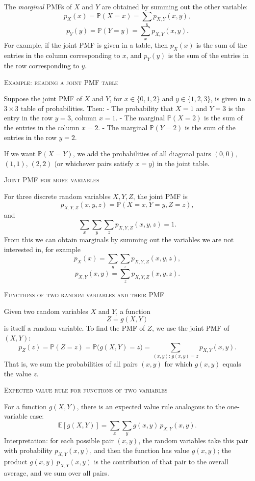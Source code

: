 The \textit{marginal} PMFs of \(X\) and \(Y\) are obtained by summing out the other variable:
\[
p_X(x) = \mathbb{P}(X = x) = \sum_{y} p_{X,Y}(x,y),
\]
\[
p_Y(y) = \mathbb{P}(Y = y) = \sum_{x} p_{X,Y}(x,y).
\]
For example, if the joint PMF is given in a table, then \(p_X(x)\) is the sum of the entries in the column corresponding to \(x\), and \(p_Y(y)\) is the sum of the entries in the row corresponding to \(y\).

\bigskip\textsc{Example: reading a joint PMF table}

Suppose the joint PMF of \(X\) and \(Y\), for \(x \in \{0,1,2\}\) and \(y \in \{1,2,3\}\), is given in a \(3\times 3\) table of probabilities.  
Then:
- The probability that \(X=1\) and \(Y=3\) is the entry in the row \(y=3\), column \(x=1\).  
- The marginal \(\mathbb{P}(X=2)\) is the sum of the entries in the column \(x=2\).  
- The marginal \(\mathbb{P}(Y=2)\) is the sum of the entries in the row \(y=2\).  

If we want \(\mathbb{P}(X=Y)\), we add the probabilities of all diagonal pairs \((0,0)\), \((1,1)\), \((2,2)\) (or whichever pairs satisfy \(x=y\)) in the joint table.

\bigskip\textsc{Joint PMF for more variables}

For three discrete random variables \(X,Y,Z\), the joint PMF is
\[
p_{X,Y,Z}(x,y,z) = \mathbb{P}(X=x, Y=y, Z=z),
\]
and
\[
\sum_{x}\sum_{y}\sum_{z} p_{X,Y,Z}(x,y,z) = 1.
\]
From this we can obtain marginals by summing out the variables we are not interested in, for example
\[
p_X(x) = \sum_{y}\sum_{z} p_{X,Y,Z}(x,y,z),
\]
\[
p_{X,Y}(x,y) = \sum_{z} p_{X,Y,Z}(x,y,z).
\]

\bigskip\textsc{Functions of two random variables and their PMF}

Given two random variables \(X\) and \(Y\), a function
\[
Z = g(X,Y)
\]
is itself a random variable.  
To find the PMF of \(Z\), we use the joint PMF of \((X,Y)\):
\[
p_Z(z) = \mathbb{P}(Z = z)
= \mathbb{P}\bigl(g(X,Y) = z\bigr)
= \sum_{(x,y):\, g(x,y) = z} p_{X,Y}(x,y).
\]
That is, we sum the probabilities of all pairs \((x,y)\) for which \(g(x,y)\) equals the value \(z\).

\bigskip\textsc{Expected value rule for functions of two variables}

For a function \(g(X,Y)\), there is an expected value rule analogous to the one-variable case:
\[
\mathbb{E}[g(X,Y)] = \sum_{x}\sum_{y} g(x,y)\,p_{X,Y}(x,y).
\]
Interpretation: for each possible pair \((x,y)\), the random variables take this pair with probability \(p_{X,Y}(x,y)\), and then the function has value \(g(x,y)\); the product \(g(x,y)\,p_{X,Y}(x,y)\) is the contribution of that pair to the overall average, and we sum over all pairs.


